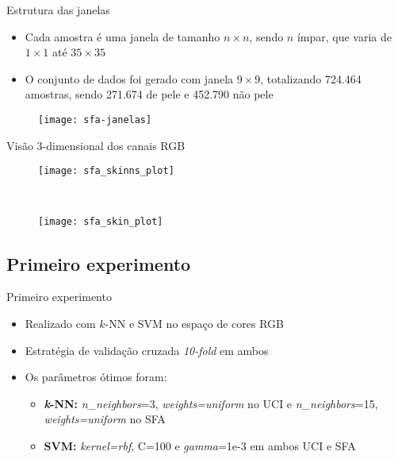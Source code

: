 \begin{frame}{Estrutura das janelas}
  \begin{itemize}
      \item Cada amostra é uma janela de tamanho $n\times n$, sendo $n$ ímpar, que varia de $1 \times 1$ até $35 \times 35$
      
      \item O conjunto de dados foi gerado com janela $9 \times 9$, totalizando 724.464 amostras, sendo 271.674 de pele e 452.790 não pele
  \end{itemize}

  \begin{figure}
    \centering
    \texttt{[image: sfa-janelas]}
  \end{figure}
\end{frame}

\begin{frame}{Visão 3-dimensional dos canais RGB}
\begin{figure}[h]
    \centering
    \begin{minipage}{0.45\textwidth}
        \texttt{[image: sfa\_skinns\_plot]}
    \end{minipage}
    ~ %
    \begin{minipage}{0.45\textwidth}
        \texttt{[image: sfa\_skin\_plot]}
    \end{minipage}
\end{figure}
\end{frame}

\subsection{Primeiro experimento}
\begin{frame}{Primeiro experimento}
  \begin{itemize}
      \item Realizado com $k$-NN e SVM no espaço de cores RGB
      \item Estratégia de validação cruzada \emph{10-fold} em ambos
      \item Os parâmetros ótimos foram:
      \begin{itemize}
          \item \textbf{\emph{k}-NN:} \emph{n\_neighbors}=3, \emph{weights=uniform} no UCI e \emph{n\_neighbors}=15, \emph{weights=uniform} no SFA
          \item \textbf{SVM:} \emph{kernel=rbf}, C=100 e \emph{gamma}=1e-3 em ambos UCI e SFA
      \end{itemize}
  \end{itemize}
\end{frame}

